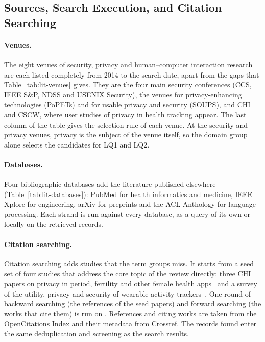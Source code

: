 \subsection{Sources, Search Execution, and Citation Searching}
\label{sec:lit-sources}
\paragraph{Venues.} The eight venues of security, privacy and human--computer
interaction research are each listed completely from 2014 to the search date, apart from the
gaps that Table~\ref{tab:lit-venues} gives. They are the four main security conferences (CCS, IEEE
S\&P, NDSS and USENIX Security), the venues for privacy-enhancing technologies
(PoPETs) and for usable privacy and security (SOUPS), and CHI and CSCW, where
user studies of privacy in health tracking appear. The last column of the table
gives the selection rule of each venue. At the security and privacy venues, privacy is
the subject of the venue itself, so the domain group alone selects the
candidates for LQ1 and LQ2.

\paragraph{Databases.} Four bibliographic databases add the literature published
elsewhere (Table~\ref{tab:lit-databases}): PubMed for health informatics and
medicine, IEEE Xplore for engineering, arXiv for preprints and the ACL Anthology
for language processing. Each strand is run against every database, as a query
of its own or locally on the retrieved records.

\paragraph{Citation searching.} Citation searching adds studies that the term
groups miss. It starts from a seed set of four studies that address the core
topic of the review directly: three CHI papers on privacy in period, fertility
and other female health
apps~\parencite{malki2024exploring,hudig2025intimate,cao2024deleted} and a
survey of the utility, privacy and security of wearable activity
trackers~\parencite{niksirat2024wearable}. One round of backward searching (the
references of the seed papers) and forward searching (the works that cite them)
is run on \highlight[orange!25]{\textbf{[?]}}. References and citing works are taken from the OpenCitations Index and
their metadata from Crossref. The records found enter the same deduplication
and screening as the search results.

